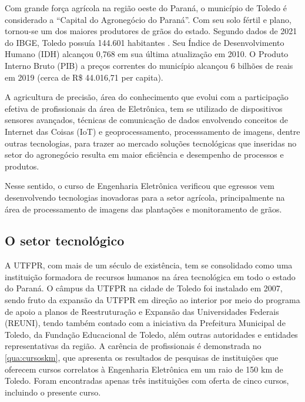 Com grande força agrícola na região oeste do Paraná, o município de Toledo é considerado a ``Capital do Agronegócio do Paraná''. Com seu solo fértil e plano, tornou-se um dos maiores produtores de grãos do estado. Segundo dados de 2021 do IBGE, Toledo possuía 144.601 habitantes \cite{ibge2020}. Seu Índice de Desenvolvimento Humano (IDH) alcançou 0,768 em sua última atualização em 2010. O Produto Interno Bruto (PIB) a preços correntes do município alcançou 6 bilhões de reais em 2019 (cerca de R\$ 44.016,71 per capita). 


A agricultura de precisão, área do conhecimento que evolui com a participação efetiva de profissionais da área de Eletrônica, tem se utilizado de dispositivos sensores avançados, técnicas de comunicação de dados envolvendo conceitos de Internet das Coisas (IoT) e geoprocessamento, processsamento de imagens, dentre outras tecnologias, para trazer ao mercado soluções tecnológicas que inseridas no setor do agronegócio resulta em maior eficiência e desempenho de processos e produtos. 

Nesse sentido, o curso de Engenharia Eletrônica verificou que egressos vem desenvolvendo tecnologias inovadoras para a setor agrícola, principalmente na área de processamento de imagens das plantações e monitoramento de grãos.

\subsection{O setor tecnológico}

A UTFPR, com mais de um século de existência, tem se consolidado como uma instituição formadora de recursos humanos na área tecnológica em todo o estado do Paraná. O câmpus da UTFPR na cidade de Toledo foi instalado em 2007, sendo fruto da expansão da UTFPR em direção ao interior por meio do programa de apoio a planos de Reestruturação e Expansão das Universidades Federais (REUNI), tendo também contado com a iniciativa da Prefeitura Municipal de Toledo, da Fundação Educacional de Toledo, além outras autoridades e entidades representativas da região. A carência de profissionais é demonstrada no \autoref{qua:cursoskm}, que apresenta os resultados de pesquisas de instituições que oferecem cursos correlatos à Engenharia Eletrônica em um raio de 150 km de Toledo. Foram encontradas apenas três instituições com oferta de cinco cursos, incluindo o presente curso.

